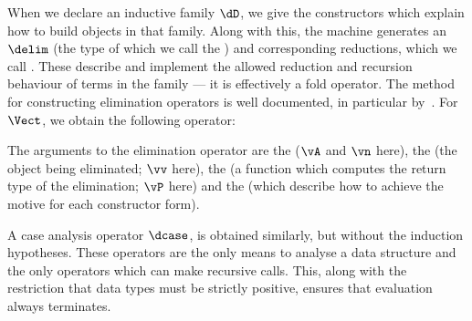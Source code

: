 When we declare an inductive family $\dD$, we give the constructors
which explain how to build objects in that family. Along with this,
the machine generates an  $\delim$ (the
type of which we call the ) and corresponding
reductions, which we call
. These
describe and implement the allowed reduction and recursion behaviour
of terms in the family --- it is effectively a fold operator.  The
method for constructing elimination operators is well documented, in
particular by~\cite{dybjer94,luo94,mcbride-thesis}.
For $\Vect$, we obtain the following operator:


The arguments to the elimination operator are the  ($\vA$
and $\vn$ here), the  (the object being eliminated;
$\vv$ here), the  (a function which computes the return
type of the elimination; $\vP$ here) and the 
(which describe how to achieve the motive for each constructor form).

A case analysis operator $\dcase$, is obtained similarly, but without
the induction hypotheses. These operators are the only means to
analyse a data structure and the only operators which can make
recursive calls. This, along with the restriction that data types must
be strictly positive, ensures that evaluation always terminates.

